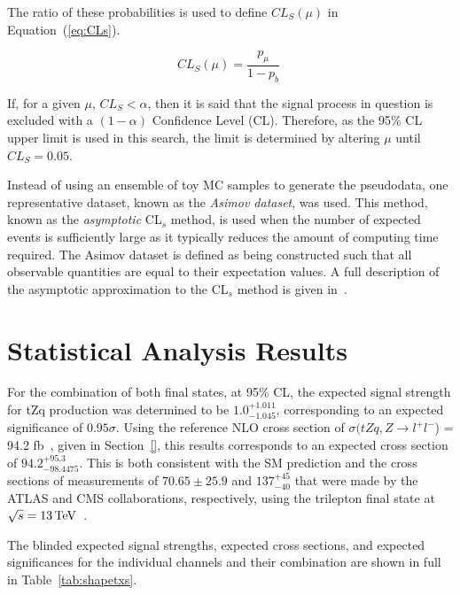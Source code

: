 The ratio of these probabilities is used to define $CL_{S} (\mu)$ in Equation~(\ref{eq:CLs}).

\begin{equation}
CL_{S} (\mu) = \frac{ p_{\mu} }{ 1 - p_{b} }\;
\label{eq:CLs}
\end{equation}

If, for a given $\mu$, $CL_{S} < \alpha$, then it is said that the signal process in question is excluded with a $(1 - \alpha)$ Confidence Level (CL).
Therefore, as the 95\% CL upper limit is used in this search, the limit is determined by altering $\mu$  until $CL_{S} = 0.05$.

Instead of using an ensemble of toy MC samples to generate the pseudodata, one representative dataset, known as the \emph{Asimov dataset}, was used.
This method, known as the \emph{asymptotic} CL$_{s}$ method, is used when the number of expected events is sufficiently large as it typically reduces the amount of computing time required.
The Asimov dataset is defined as being constructed such that all observable quantities are equal to their expectation values.
A full description of the asymptotic approximation to the CL$_{s}$ method is given in~\cite{AsymptoticFormulae}.

\section{Statistical Analysis Results}\label{sec:results}
For the combination of both final states, at 95\% CL, the expected signal strength for tZq production was determined to be $1.0^{+1.011}_{-1.045}$, corresponding to an expected significance of $0.95 \sigma$.
Using the reference NLO cross section of $\sigma (tZq, Z \rightarrow l^{+} l^{-}$) = 94.2 fb~\cite{Campbell:2013yla}, given in Section~\ref{}, this results corresponds to an expected cross section of $94.2^{+95.3}_{-98.4475}$.
This is both consistent with the SM prediction and the cross sections of measurements of $70.65 \pm 25.9$ and $137^{+45}_{-40}$ that were made by the ATLAS and CMS collaborations, respectively, using the trilepton final state at $\sqrt{s} = 13 \,\text{Te\hspace{-.08em}V}$~\cite{Aaboud:2017ylb,Sirunyan:2017nbr}.

The blinded expected signal strengths, expected cross sections, and expected significances for the individual channels and their combination are shown in full in Table~\ref{tab:shapetxs}.

